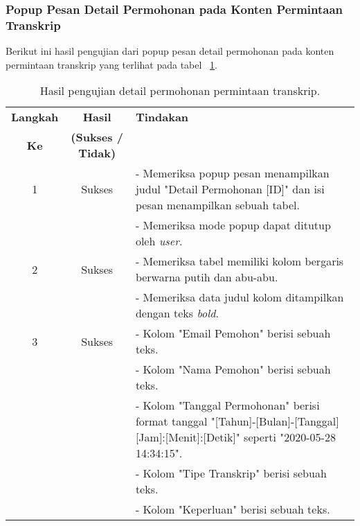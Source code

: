\subsubsection{Popup Pesan Detail Permohonan pada Konten Permintaan Transkrip}
Berikut ini hasil pengujian dari popup pesan detail permohonan pada konten permintaan transkrip yang terlihat pada tabel ~\ref{hasil:DetailPermintaanTranskrip}.
\begin{table}[H]
	\centering 
	\caption{Hasil pengujian detail permohonan permintaan transkrip.}
	\label{hasil:DetailPermintaanTranskrip}
	\begin{tabular}{|c| c| p{}|}
		\toprule
		\textbf{Langkah} & \textbf{Hasil} & \textbf{Tindakan}\\
		\textbf{Ke} & \textbf{(Sukses / Tidak)} &\\
		\midrule
		1&Sukses& - Memeriksa popup pesan menampilkan judul "Detail Permohonan [ID]" dan isi pesan menampilkan sebuah tabel.\\
		&& - Memeriksa mode popup dapat ditutup oleh \textit{user}.\\
		\hline
		2&Sukses&- Memeriksa tabel memiliki kolom bergaris berwarna putih dan abu-abu.\\
		&& - Memeriksa data judul kolom ditampilkan dengan teks \textit{bold}.	\\	
		\hline
		3&Sukses&- Kolom "Email Pemohon" berisi sebuah teks.\\
		&&- Kolom "Nama Pemohon" berisi sebuah teks.\\
		&&- Kolom "Tanggal Permohonan" berisi format tanggal "[Tahun]-[Bulan]-[Tanggal] [Jam]:[Menit]:[Detik]" seperti "2020-05-28 14:34:15".\\
		&&- Kolom "Tipe Transkrip" berisi sebuah teks.\\
		&&- Kolom "Keperluan" berisi sebuah teks.\\
		\bottomrule		
	\end{tabular} 
\end{table}

